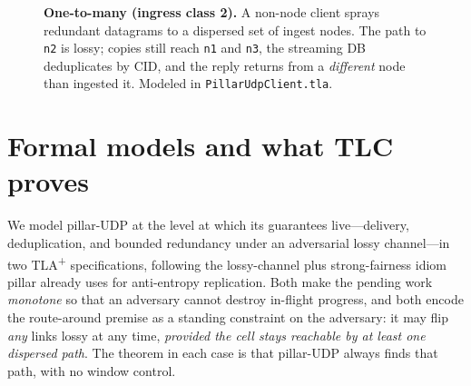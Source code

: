 \documentclass[10pt,twocolumn]{article}
\newcommand{\code}[1]{\texttt{\small #1}}
\begin{document}
\begin{figure}[t]
\centering
{}
\caption{\textbf{One-to-many (ingress class 2).} A non-node client sprays
redundant datagrams to a dispersed set of ingest nodes. The path to \code{n2}
is lossy; copies still reach \code{n1} and \code{n3}, the streaming DB
deduplicates by CID, and the reply returns from a \emph{different} node than
ingested it. Modeled in \code{PillarUdpClient.tla}.}
\label{fig:onetomany}
\end{figure}

\section{Formal models and what TLC proves}
We model pillar-UDP at the level at which its guarantees live---delivery,
deduplication, and bounded redundancy under an adversarial lossy channel---in
two TLA\textsuperscript{+} specifications, following the lossy-channel plus
strong-fairness idiom pillar already uses for anti-entropy replication. Both
make the pending work \emph{monotone} so that an adversary cannot destroy
in-flight progress, and both encode the route-around premise as a standing
constraint on the adversary: it may flip \emph{any} links lossy at any time,
\emph{provided the cell stays reachable by at least one dispersed path}. The
theorem in each case is that pillar-UDP always finds that path, with no window
control.
\end{document}
